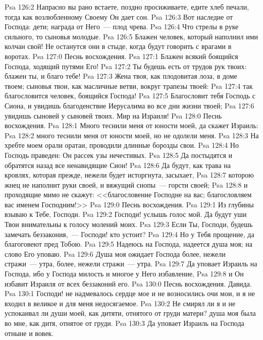 \vs Psa 126:2 Напрасно вы рано встаете, поздно просиживаете, едите хлеб печали, тогда как возлюбленному Своему Он дает сон.
\vs Psa 126:3 Вот наследие от Господа: дети; награда от Него~--- плод чрева.
\vs Psa 126:4 Что стрелы в руке сильного, то сыновья молодые.
\vs Psa 126:5 Блажен человек, который наполнил ими колчан свой! Не останутся они в стыде, когда будут говорить с врагами в воротах.
\vs Psa 127:0 Песнь восхождения.
\rsbpar\vs Psa 127:1 Блажен всякий боящийся Господа, ходящий путями Его!
\vs Psa 127:2 Ты будешь есть от трудов рук твоих: блажен ты, и благо тебе!
\vs Psa 127:3 Жена твоя, как плодовитая лоза, в доме твоем; сыновья твои, как масличные ветви, вокруг трапезы твоей:
\vs Psa 127:4 так благословится человек, боящийся Господа!
\vs Psa 127:5 Благословит тебя Господь с Сиона, и увидишь благоденствие Иерусалима во все дни жизни твоей;
\vs Psa 127:6 увидишь сыновей у сыновей твоих. Мир на Израиля!
\vs Psa 128:0 Песнь восхождения.
\rsbpar\vs Psa 128:1 Много теснили меня от юности моей, да скажет Израиль:
\vs Psa 128:2 много теснили меня от юности моей, но не одолели меня.
\vs Psa 128:3 На хребте моем орали оратаи, проводили длинные борозды свои.
\vs Psa 128:4 Но Господь праведен: Он рассек узы нечестивых.
\vs Psa 128:5 Да постыдятся и обратятся назад все ненавидящие Сион!
\vs Psa 128:6 Да будут, как трава на кровлях, которая прежде, нежели будет исторгнута, засыхает,
\vs Psa 128:7 которою жнец не наполнит руки своей, и вяжущий снопы~--- горсти своей;
\vs Psa 128:8 и проходящие мимо не скажут: <<благословение Господне на вас; благословляем вас именем Господним!>>
\vs Psa 129:0 Песнь восхождения.
\rsbpar\vs Psa 129:1 Из глубины взываю к Тебе, Господи.
\vs Psa 129:2 Господи! услышь голос мой. Да будут уши Твои внимательны к голосу молений моих.
\vs Psa 129:3 Если Ты, Господи, будешь замечать беззакония,~--- Господи! кто устоит?
\vs Psa 129:4 Но у Тебя прощение, да благоговеют пред Тобою.
\vs Psa 129:5 Надеюсь на Господа, надеется душа моя; на слово Его уповаю.
\vs Psa 129:6 Душа моя ожидает Господа более, нежели стражи~--- утра, более, нежели стражи~--- утра.
\vs Psa 129:7 Да уповает Израиль на Господа, ибо у Господа милость и многое у Него избавление,
\vs Psa 129:8 и Он избавит Израиля от всех беззаконий его.
\vs Psa 130:0 Песнь восхождения. Давида.
\rsbpar\vs Psa 130:1 Господи! не надмевалось сердце мое и не возносились очи мои, и я не входил в великое и для меня недосягаемое.
\vs Psa 130:2 Не смирял ли я и не успокаивал ли души моей, как дитяти, отнятого от груди матери? душа моя была во мне, как дитя, отнятое от груди.
\vs Psa 130:3 Да уповает Израиль на Господа отныне и вовек.
